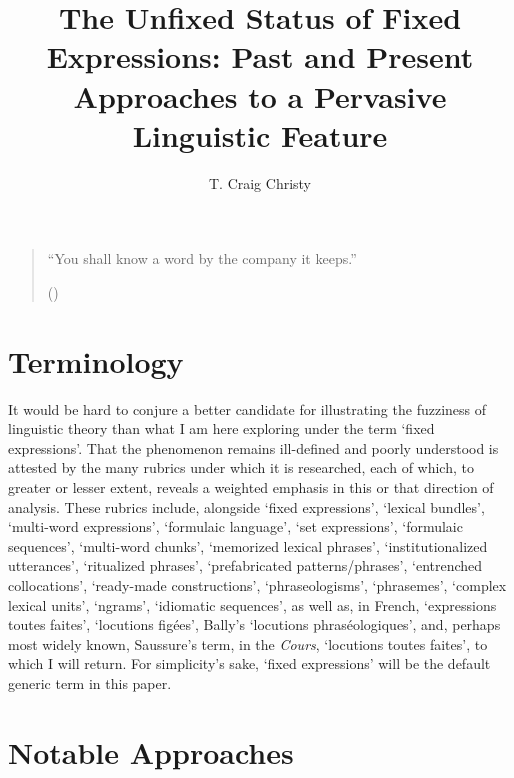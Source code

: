 \documentclass[output=paper]{langsci/langscibook}
\author{T. Craig Christy\affiliation{University of North Alabama}\orcid{}}
\title{The Unfixed Status of Fixed Expressions: Past and Present Approaches to a Pervasive Linguistic Feature }
\begin{document}
\maketitle
\begin{quote}
    \begin{small}
“You shall know a word by the company it keeps.”  

(\citealt[11]{firth_synopsis_1957})
    \end{small}
\end{quote}

\section{Terminology}

It would be hard to conjure a better candidate for illustrating the fuzziness of linguistic theory than what I am here exploring under the term ‘fixed expressions’. That the phenomenon remains ill-defined and poorly understood is attested by the many rubrics under which it is researched, each of which, to greater or lesser extent, reveals a weighted emphasis in this or that direction of analysis. These rubrics include, alongside ‘fixed expressions’, ‘lexical bundles’, ‘multi-word expressions’, ‘formulaic language’, ‘set expressions’, ‘formulaic sequences’, ‘multi-word chunks’, ‘memorized lexical phrases’, ‘institutionalized utterances’, ‘ritualized phrases’, ‘prefabricated patterns/phrases’, ‘entrenched collocations’, ‘ready-made constructions’, ‘phraseologisms’, ‘phrasemes’, ‘complex lexical units’, ‘ngrams’, ‘idiomatic sequences’, as well as, in French, ‘expressions toutes faites’, ‘locutions figées’, Bally’s ‘locutions phraséologiques’, and, perhaps most widely known, Saussure’s term, in the \textit{Cours}, ‘locutions toutes faites’, to which I will return. For simplicity’s sake, ‘fixed expressions’ will be the default generic term in this paper. 

\section{Notable Approaches}
\end{document}
